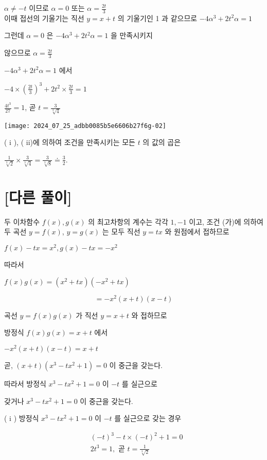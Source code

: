 \documentclass[10pt]{article}
\begin{document}
$\alpha \neq-t$ 이므로 $\alpha=0$ 또는 $\alpha=\frac{2 t}{3}$\\
이때 접선의 기울기는 직선 $y=x+t$ 의 기울기인 1 과 같으므로 $-4 \alpha^{3}+2 t^{2} \alpha=1$

그런데 $\alpha=0$ 은 $-4 \alpha^{3}+2 t^{2} \alpha=1$ 을 만족시키지

않으므로 $\alpha=\frac{2 t}{3}$

$-4 \alpha^{3}+2 t^{2} \alpha=1$ 에서

$-4 \times\left(\frac{2 t}{3}\right)^{3}+2 t^{2} \times \frac{2 t}{3}=1$

$\frac{4 t^{3}}{27}=1$, 곧 $t=\frac{3}{\sqrt[3]{4}}$

\begin{center}
\texttt{[image: 2024\_07\_25\_adbb0085b5e6606b27f6g-02]}
\end{center}

( i ), ( ii)에 의하여 조건을 만족시키는 모든 $t$ 의 값의 곱은

$\frac{1}{\sqrt[3]{2}} \times \frac{3}{\sqrt[3]{4}}=\frac{3}{\sqrt[3]{8}} \doteq \frac{3}{2}$.

\section*{[다른 풀이]}
두 이차함수 $f(x), g(x)$ 의 최고차항의 계수는 각각 $1,-1$ 이고, 조건 (가)에 의하여 두 곡선 $y=f(x)$, $y=g(x)$ 는 모두 직선 $y=t x$ 와 원점에서 접하므로

$f(x)-t x=x^{2}, g(x)-t x=-x^{2}$

따라서

$f(x) g(x)=\left(x^{2}+t x\right)\left(-x^{2}+t x\right)$

\[
=-x^{2}(x+t)(x-t)
\]

곡선 $y=f(x) g(x)$ 가 직선 $y=x+t$ 와 접하므로

방정식 $f(x) g(x)=x+t$ 에서

$-x^{2}(x+t)(x-t)=x+t$

곧, $(x+t)\left(x^{3}-t x^{2}+1\right)=0$ 이 중근을 갖는다.

따라서 방정식 $x^{3}-t x^{2}+1=0$ 이 $-t$ 를 실근으로

갖거나 $x^{3}-t x^{2}+1=0$ 이 중근을 갖는다.

( i ) 방정식 $x^{3}-t x^{2}+1=0$ 이 $-t$ 를 실근으로 갖는 경우

\[
\begin{aligned}
& (-t)^{3}-t \times(-t)^{2}+1=0 \\
& 2 t^{3}=1, \text { 곧 } t=\frac{1}{\sqrt[3]{2}}
\end{aligned}
\]
\end{document}
